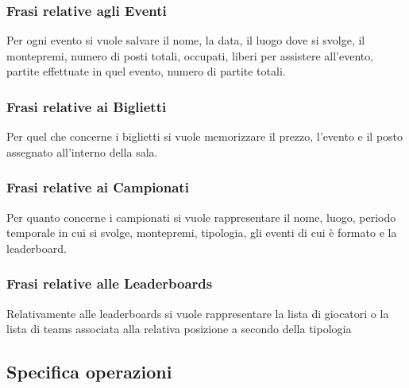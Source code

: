\documentclass{article}
\begin{document}
\subsubsection{Frasi relative agli Eventi}

Per ogni evento si vuole salvare il nome, la data, il luogo dove si svolge, il montepremi, numero di posti totali, occupati, liberi per assistere all'evento, partite effettuate in quel evento, numero di partite totali.

\subsubsection{Frasi relative ai Biglietti}

Per quel che concerne i biglietti si vuole memorizzare il prezzo, l'evento e il posto assegnato all'interno della sala.

\subsubsection{Frasi relative ai Campionati}

Per quanto concerne i campionati si vuole rappresentare il nome, luogo, periodo temporale in cui si svolge, montepremi, tipologia, gli eventi di cui è formato e la leaderboard.

\subsubsection{Frasi relative alle Leaderboards}

Relativamente alle leaderboards si vuole rappresentare la lista di giocatori o la lista di teams associata alla relativa posizione a secondo della tipologia

\subsection{Specifica operazioni}
\end{document}
